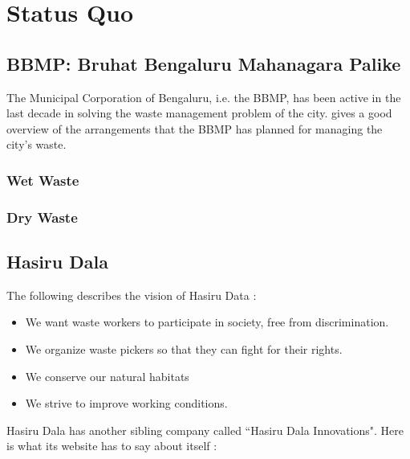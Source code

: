 \documentclass[10pt]{article}
\begin{document}

\section{Status Quo}



\subsection{BBMP: Bruhat Bengaluru Mahanagara Palike}

The Municipal Corporation of Bengaluru, i.e. the BBMP, has been active in the last decade in solving the waste management problem of the city. \cite{BBMP:SWMOverview} gives a good overview of the arrangements that the BBMP has planned for managing the city's waste.

\subsubsection{Wet Waste}

\subsubsection{Dry Waste}

\subsection{Hasiru Dala}

The following describes the vision of Hasiru Data \citep{HasiruDala:home}:

\begin{itemize}
\item We want waste workers to participate in society, free from discrimination.
\item We organize waste pickers so that they can fight for their rights.
\item We conserve our natural habitats
\item We strive to improve working conditions.
\end{itemize}

Hasiru Dala has another sibling company called ``Hasiru Dala Innovations". Here is what its website has to say about itself \citep{HasiruDalaInnovations:about}:
\end{document}
